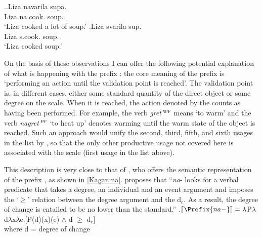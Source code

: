 \ex.\ag.\label{ex:navarit}Liza navarila supa.\\
Liza na.cook. soup.\\
\trans `Liza cooked a lot of soup.'
\bg.\label{ex:svarit}Liza svarila sup.\\
Liza s.cook. soup.\\
\trans `Liza cooked soup.'

On the basis of these observations I can offer the following potential explanation of what is happening with the prefix : the core meaning of the  prefix  is `performing an action until the validation point is reached'. The validation point is, in different cases, either some standard quantity of the direct object or some degree on the scale. When it is reached, the action denoted by the  counts as having been performed. For example, the verb \textit{gret'}$^{\textsc{ipf}}$ means `to warm' and the verb \textit{nagret'}$^{\textsc{pf}}$ `to heat up' denotes warming until the warm state of the object is reached. Such an approach would unify the second, third, fifth, and sixth usages in the list by \citet{Shvedova:82}, so that the only other productive usage not covered here is associated with the  scale (first usage in the list above). 

This description is very close to that of \citet{Kagan:book}, who offers the semantic representation of the prefix , as shown in \ref{Kagan:na}. \citet[55]{Kagan:book} proposes that ``\textit{na}- looks for a verbal predicate that takes a degree, an individual and an event argument and imposes the `$\geqslant$' relation between the degree argument and the   d$_c$. As a result, the degree of change is entailed to be no lower than the standard.''
\ex.\label{Kagan:na}$\llbracket \Prefix{na-} \rrbracket = \lambda$P$\lambda$d$\lambda$x$\lambda$e.[P(d)(x)(e) $\wedge$ d $\geqslant$ d$_c$]\\
where d = degree of change \citep{KennedyLevin:02}\\

